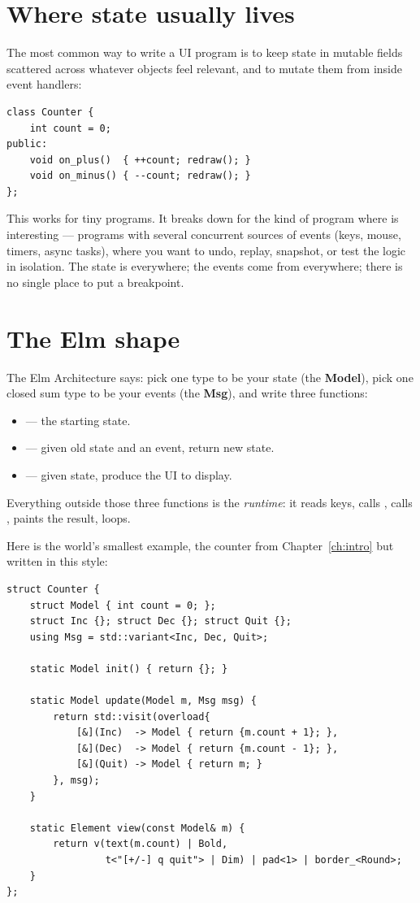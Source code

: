 \section{Where state usually lives}

The most common way to write a UI program is to keep state in mutable
fields scattered across whatever objects feel relevant, and to mutate
them from inside event handlers:

\begin{lstlisting}
class Counter {
    int count = 0;
public:
    void on_plus()  { ++count; redraw(); }
    void on_minus() { --count; redraw(); }
};
\end{lstlisting}

This works for tiny programs. It breaks down for the kind of program
where \maya{} is interesting --- programs with several concurrent
sources of events (keys, mouse, timers, async tasks), where you want
to undo, replay, snapshot, or test the logic in isolation. The state
is everywhere; the events come from everywhere; there is no single
place to put a breakpoint.

\section{The Elm shape}

The Elm Architecture says: pick one type to be your state (the
\textbf{Model}), pick one closed sum type to be your events (the
\textbf{Msg}), and write three functions:

\begin{itemize}[leftmargin=*]
  \item {} --- the starting state.
  \item {} --- given old state and an
    event, return new state.
  \item {} --- given state,
    produce the UI to display.
\end{itemize}

Everything outside those three functions is the \emph{runtime}: it
reads keys, calls , calls , paints the result,
loops.

Here is the world's smallest example, the counter from
Chapter~\ref{ch:intro} but written in this style:

\begin{lstlisting}
struct Counter {
    struct Model { int count = 0; };
    struct Inc {}; struct Dec {}; struct Quit {};
    using Msg = std::variant<Inc, Dec, Quit>;

    static Model init() { return {}; }

    static Model update(Model m, Msg msg) {
        return std::visit(overload{
            [&](Inc)  -> Model { return {m.count + 1}; },
            [&](Dec)  -> Model { return {m.count - 1}; },
            [&](Quit) -> Model { return m; }
        }, msg);
    }

    static Element view(const Model& m) {
        return v(text(m.count) | Bold,
                 t<"[+/-] q quit"> | Dim) | pad<1> | border_<Round>;
    }
};
\end{lstlisting}

